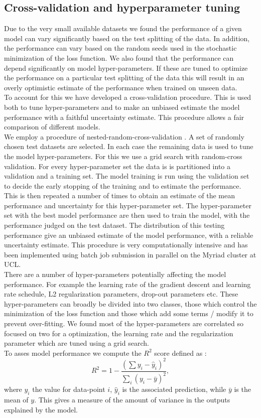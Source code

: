 \documentclass[NOTE, disdraft=true, UKenglish]{\DISCDTLATEXPATH UCLCDTDISdoc}
\begin{document}
\subsection{Cross-validation and hyperparameter tuning}
Due to the very small available datasets we found the performance of a given model can vary significantly based on the test splitting of the data. In addition, the performance can vary based on the random seeds used in the stochastic minimization of the loss function. We also found that the performance can depend significantly on model hyper-parameters. If these are tuned to optimize the performance on a particular test splitting of the data this will result in an overly optimistic estimate of the performance when trained on unseen data.
\\ \indent To account for this we have developed a cross-validation procedure. This is used both to tune hyper-parameters and to make an unbiased estimate the model performance with a faithful uncertainty estimate. This procedure allows a fair comparison of different models.
\\ \indent We employ a procedure of nested-random-cross-validation \cite{}. A set of randomly chosen test datasets  are selected. In each case the remaining data is used to tune the model hyper-parameters. For this we use a grid search with random-cross validation. For every hyper-parameter set the data is is partitioned into a validation and a training set. The model training is run using the validation set to decide the early stopping of the training and to estimate the performance. This is then repeated a number of times to obtain an estimate of the mean performance and uncertainty for this hyper-parameter set. The hyper-parameter set with the best model performance are then used to train the model, with the performance judged on the test dataset. The distribution of this testing performance give an unbiased estimate of the model performance, with a reliable uncertainty estimate. This procedure is very computationally intensive and has been implemented using batch job submission in parallel on the Myriad cluster at UCL.
\\ \indent There are a number of hyper-parameters potentially affecting the model performance. For example the learning rate of the gradient descent and learning rate schedule, L2 regularization parameters, drop-out parameters etc. These hyper-parameters can broadly be divided into two classes, those which control the minimization of the loss function and those which add some terms / modify it to prevent over-fitting. We found most of the hyper-parameters are correlated so focused on two for a optimization, the learning rate and the regularization parameter which are tuned using a grid search.
\\ \indent To asses model performance we compute the $R^2$ score defined as \cite{scikit-learn-docs}:
\begin{equation}
    R^2 = 1-\frac{(\sum y_i - \hat{y}_i)^2}{\sum_i (y_i - \bar{y})^2},
\end{equation}
where $y_i$ the value for data-point $i$, $\hat{y}_i$ is the associated prediction, while $\bar{y}$ is the mean of $y$. This gives a measure of the amount of variance in the outputs explained by the model.
%
\end{document}
